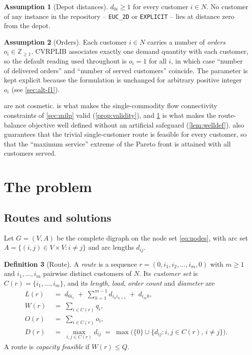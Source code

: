 \documentclass[11pt,a4paper]{article}
\theoremstyle{definition}
\newtheorem{definition}{Definition}[section]
\newtheorem{assumption}[definition]{Assumption}
\theoremstyle{plain}
\newcommand{\Z}{\mathbb{Z}}
\newcommand{\Arcs}{A}
\newcommand{\Cust}{N}
\newcommand{\Nodes}{V}
\begin{document}
\begin{assumption}[Depot distances]
\label{as:depot}
$d_{0i} \ge 1$ for every customer $i \in \Cust$.  No customer of any instance
in the repository -- \texttt{EUC\_2D} or \texttt{EXPLICIT} -- lies at distance
zero from the depot.
\end{assumption}

\begin{assumption}[Orders]
\label{as:orders}
Each customer $i \in \Cust$ carries a number of \emph{orders}
$o_i \in \Z_{\ge 1}$.  CVRPLIB associates exactly one demand quantity with each
customer, so the default reading used throughout is $o_i = 1$ for all $i$, in
which case ``number of delivered orders'' and ``number of served customers''
coincide.  The parameter is kept explicit because the formulation is unchanged
for arbitrary positive integer $o_i$ (see \cref{sec:alt-f1}).
\end{assumption}

 are not cosmetic.   is what makes the
single-commodity flow connectivity constraints of \cref{sec:milp} valid
(\cref{prop:validity}), and \cref{as:depot} is what makes the route-balance
objective well defined without an artificial safeguard (\cref{lem:welldef}).
 also guarantees that the trivial single-customer route is
feasible for every customer, so that the ``maximum service'' extreme of the
Pareto front is attained with all customers served.

\section{The problem}
\label{sec:problem}

\subsection{Routes and solutions}

Let $G = (\Nodes, \Arcs)$ be the complete digraph on the node set
\eqref{eq:nodes}, with arc set $\Arcs = \{(i,j) \in \Nodes\times\Nodes : i\ne j\}$
and arc lengths $d_{ij}$.

\begin{definition}[Route]
\label{def:route}
A \emph{route} is a sequence $r = (0, i_1, i_2, \dots, i_m, 0)$ with $m \ge 1$
and $i_1,\dots,i_m$ pairwise distinct customers of $\Cust$.  Its
\emph{customer set} is $C(r) = \{i_1,\dots,i_m\}$, and its \emph{length},
\emph{load}, \emph{order count} and \emph{diameter} are
\begin{align}
  L(r) &\;=\; d_{0 i_1} \;+\; \sum_{h=1}^{m-1} d_{i_h i_{h+1}} \;+\; d_{i_m 0},
  \label{eq:Lr}\\
  W(r) &\;=\; \sum_{i \in C(r)} q_i,
  \label{eq:Wr}\\
  O(r) &\;=\; \sum_{i \in C(r)} o_i,
  \label{eq:Or}\\
  D(r) &\;=\; \max_{i,j \in C(r)} d_{ij}
        \;=\; \max \bigl( \{0\} \cup \{ d_{ij} : i,j \in C(r),\, i \ne j \} \bigr).
  \label{eq:Dr}
\end{align}
A route is \emph{capacity feasible} if $W(r) \le Q$.
\end{definition}
\end{document}
